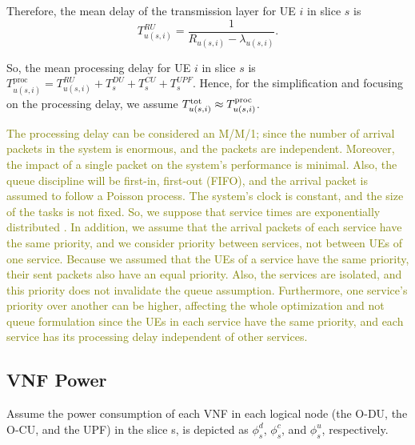 \documentclass[lettersize,journal]{IEEEtran}
\begin{document}
Therefore, the mean delay of the transmission layer for UE $i$ in slice $s$ is
\begin{equation}
 T_{u(s,i)}^{RU} = \frac{1}{R_{u(s,i)} - \lambda_{u(s,i)}}.
\end{equation}

So, the mean processing delay for UE $i$ in slice $s$ is $T^{\text{proc}}_{u(s,i)} =  T^{RU}_{u(s,i)} + T^{DU}_{s} + T^{CU}_{s} + T^{UPF}_{s}.$
Hence, for the simplification and focusing on the processing delay, we assume $T^{\text{\text{tot}}}_{u(s,i)} \approx T^{\text{proc}}_{u(s,i)} $. %

\textcolor{olive}{The processing delay can be considered an M/M/1; since the number of arrival packets in the system is enormous, and the packets are independent. Moreover, the impact of a single packet on the system's performance is minimal. Also, the queue discipline will be first-in, first-out (FIFO), and the arrival packet is assumed to follow a Poisson process. The system's clock is constant, and the size of the tasks is not fixed. So, we suppose that service times are exponentially distributed \cite{QS}. In addition, we assume that the arrival packets of each service have the same priority, and we consider priority between services, not between UEs of one service. Because we assumed that the UEs of a service have the same priority, their sent packets also have an equal priority. Also, the services are isolated, and this priority does not invalidate the queue assumption. Furthermore, one service's priority over another can be higher, affecting the whole optimization and not queue formulation since the UEs in each service have the same priority, and each service has its processing delay independent of other services.} 
\subsection{VNF Power}
Assume the power consumption of each VNF in each logical node (the O-DU, the O-CU, and the UPF) in the slice s, is depicted as $\phi_{s}^d$, $\phi_{s}^c$, and $\phi_{s}^u$, respectively. 
\end{document}
